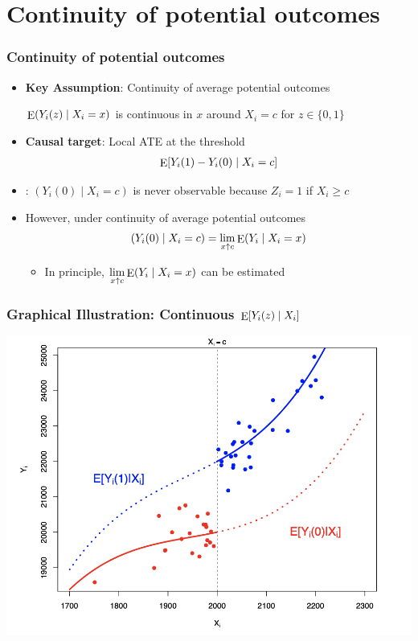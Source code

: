 \documentclass[table, xcolor = {dvipsnames}, 9pt]{beamer}
\theoremstyle{plain}
\newcommand{\mh}[1]{{\color{magenta}{#1}}}
\DeclareMathOperator{\E}{\rm{E}}
\begin{document}
\section{Continuity of potential outcomes}
\begin{frame}
\frametitle{Continuity of potential outcomes} 
\begin{itemize} \vfill
\item {\bf Key Assumption}: \alert{Continuity of average potential outcomes} \vfill
\begin{center} \vfill
$\E(Y_i(z)\mid X_i=x)$ is continuous in $x$ around $X_i = c$
for $z \in \{0, 1\}$
\end{center} \vfill
\item {\bf Causal target}: Local ATE at the threshold \vfill
\begin{align*}
\E[Y_i(1) - Y_i(0) \mid X_i = c]
\end{align*} \vfill
\item \mh{Note}: $\left(Y_i(0) \mid X_i = c\right)$ is never observable because $Z_i = 1$ if $X_i \geq c$ \vfill
\item However, under continuity of average potential outcomes \vfill
\begin{align*}
\left(Y_i(0) \mid X_i = c\right) = \lim_{x\uparrow c}\E(Y_i \mid X_i = x)
\end{align*} \vfill
\begin{itemize} \vfill
\item In principle, $\lim \limits_{x\uparrow c}\E(Y_i \mid X_i = x)$ can be estimated \vfill
\end{itemize} \vfill
\end{itemize} \vfill
\end{frame}
\begin{frame}
\frametitle{Graphical Illustration: Continuous $\E[Y_i(z)\mid X_i]$}
\begin{center}
\includegraphics[height=.8\textheight]{figures/R2-2.png}
\end{center}
\end{frame}
\end{document}
